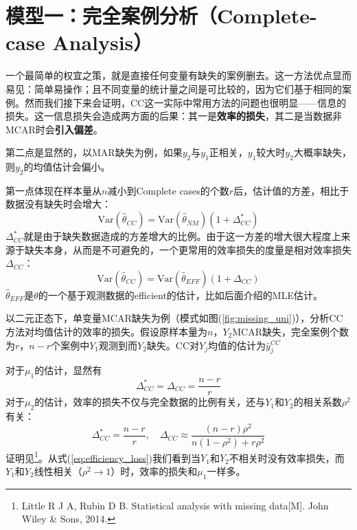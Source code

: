 \documentclass[aps,pre,12pt,preprint,onecolumn,showpacs,showkeys,AutoFakeBold]{revtex4-1}
\begin{document}
\section{模型一：完全案例分析（Complete-case Analysis）}\label{sec:complete_cases_analysis}
    一个最简单的权宜之策，就是直接任何变量有缺失的案例删去。这一方法优点显而易见：简单易操作；且不同变量的统计量之间是可比较的，因为它们基于相同的案例。然而我们接下来会证明，CC这一实际中常用方法的问题也很明显——信息的损失。这一信息损失会造成两方面的后果：其一是\textbf{效率的损失}，其二是当数据非MCAR时会\textbf{引入偏差}。

    第二点是显然的，以MAR缺失为例，如果$y_2$与$y_1$正相关，$y_1$较大时$y_2$大概率缺失，则$y_2$的均值估计会偏小。

    第一点体现在样本量从$n$减小到Complete cases的个数$r$后，估计值的方差，相比于数据没有缺失时会增大：
    \begin{equation}
        \mathrm{Var}(\hat \theta _{CC})=\mathrm{Var}(\hat \theta _{NM})(1+\Delta _{CC}^*)
    \end{equation}
    $\Delta _{CC}^*$就是由于缺失数据造成的方差增大的比例。由于这一方差的增大很大程度上来源于缺失本身，从而是不可避免的，一个更常用的效率损失的度量是相对效率损失$\Delta _{CC}$：
    \begin{equation}
        \mathrm{Var}(\hat \theta _{CC})=\mathrm{Var}(\hat \theta _{EFF})(1+\Delta _{CC})
    \end{equation}
    $\hat \theta _{EFF}$是$\theta$的一个基于观测数据的efficient的估计，比如后面介绍的MLE估计。
    
    以二元正态下，单变量MCAR缺失为例（模式如图(\ref{fig:missing_uni})），分析CC方法对均值估计的效率的损失。假设原样本量为$n$，$Y_2$MCAR缺失，完全案例个数为$r$，$n-r$个案例中$Y_1$观测到而$Y_2$缺失。CC对$Y_j$均值的估计为$\bar y_j^{CC}$
    
    对于$\mu _1$的估计，显然有
    \begin{equation}
        \Delta _{CC}^*=\Delta _{CC}=\frac{n-r}{r}
    \end{equation}
    对于$\mu _2$的估计，效率的损失不仅与完全数据的比例有关，还与$Y_1$和$Y_2$的相关系数$\rho ^2$有关：
    \begin{equation}\label{eq:efficiency_loss}
        \Delta _{CC}^*=\frac{n-r}{r},\quad
        \Delta _{CC}\approx \frac{(n-r)\rho ^2}{n (1-\rho ^2) +r \rho ^2}
    \end{equation}
    证明见\footnote{Little R J A, Rubin D B. Statistical analysis with missing data[M]. John Wiley \& Sons, 2014.}。从式(\ref{eq:efficiency_loss})我们看到当$Y_1$和$Y_2$不相关时没有效率损失，而$Y_1$和$Y_2$线性相关（$\rho^2\to 1$）时，效率的损失和$\mu _1$一样多。
\end{document}
